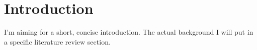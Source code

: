 \documentclass[main_thesis]{subfiles}
\begin{document}
\chapter{Introduction}

I'm aiming for a short, concise introduction. The actual background I will put in a
specific literature review section.
\end{document}
